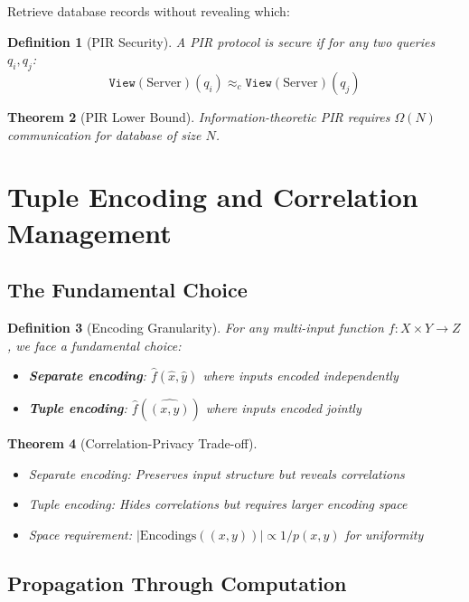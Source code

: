 \documentclass[11pt,final,hidelinks]{article}
\newtheorem{theorem}{Theorem}[section]
\newtheorem{definition}[theorem]{Definition}
\newcommand{\View}[1]{\mathtt{View}(#1)}
\begin{document}
Retrieve database records without revealing which:

\begin{definition}[PIR Security]
A PIR protocol is secure if for any two queries $q_i, q_j$:
\begin{equation}
\View{\text{Server}}(q_i) \approx_c \View{\text{Server}}(q_j)
\end{equation}
\end{definition}

\begin{theorem}[PIR Lower Bound]
Information-theoretic PIR requires $\Omega(N)$ communication for database of size $N$.
\end{theorem}

\section{Tuple Encoding and Correlation Management}

\subsection{The Fundamental Choice}

\begin{definition}[Encoding Granularity]
For any multi-input function $f: X \times Y \to Z$, we face a fundamental choice:
\begin{itemize}
    \item \textbf{Separate encoding}: $\hat{f}(\hat{x}, \hat{y})$ where inputs encoded independently
    \item \textbf{Tuple encoding}: $\hat{f}(\widehat{(x,y)})$ where inputs encoded jointly
\end{itemize}
\end{definition}

\begin{theorem}[Correlation-Privacy Trade-off]
\begin{itemize}
    \item Separate encoding: Preserves input structure but reveals correlations
    \item Tuple encoding: Hides correlations but requires larger encoding space
    \item Space requirement: $|\text{Encodings}((x,y))| \propto 1/p(x,y)$ for uniformity
\end{itemize}
\end{theorem}

\subsection{Propagation Through Computation}
\end{document}
